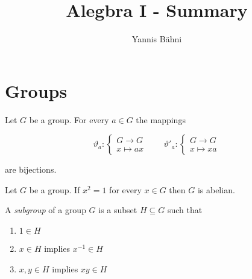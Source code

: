 


\title{Alegbra I - Summary}
\author{Yannis B\"{a}hni}
\address[Yannis B\"{a}hni]{University of Zurich, R\"{a}mistrasse 71, 8006 Zurich}

\maketitle
\thispagestyle{fancy}

\tableofcontents

\originalsectionstyle

\section{Groups}


\begin{lemma}
	Let $G$ be a group. For every $a \in G$ the mappings

	\begin{equation}
		\vartheta_a: \begin{cases}
			G \to G\\
			x \mapsto ax
		\end{cases} \qquad \vartheta'_a: \begin{cases}
			G \to G\\
			x \mapsto xa
		\end{cases}
	\end{equation}

	\noindent are bijections.
\end{lemma}

\vspace{2mm}

\begin{theorem}
	
\end{theorem}

\vspace{2mm}

\begin{lemma}
	Let $G$ be a group. If $x^2 = 1$ for every $x \in G$ then $G$ is abelian.
\end{lemma}

\vspace{2mm}

\begin{definition}
	A \emph{subgroup} of a group $G$ is a subset $H \subseteq G$ such that

	\begin{enumerate}[label = (\arabic*)]
		\item $1 \in H$\\
		\item $x \in H$ implies $x^{-1} \in H$\\
		\item $x,y \in H$ implies $xy \in H$
	\end{enumerate}
\end{definition}

